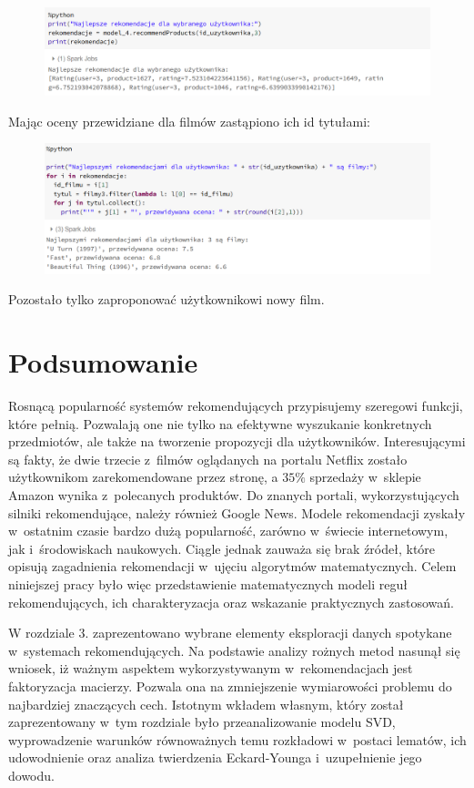 \documentclass[12pt,a4paper]{report}
\begin{document}
\begin{figure}[H]
\includegraphics[scale=0.5]{obrazy/ALS17.PNG} 
\end{figure}

Mając oceny przewidziane dla filmów zastąpiono ich id tytułami:

\begin{figure}[H]
\includegraphics[scale=0.5]{obrazy/ALS18.PNG} 
\end{figure}

Pozostało tylko zaproponować użytkownikowi nowy film.


\chapter{Podsumowanie}

Rosnącą popularność systemów rekomendujących przypisujemy szeregowi funkcji, które pełnią. Pozwalają one nie tylko na efektywne wyszukanie konkretnych przedmiotów, ale także na tworzenie propozycji dla użytkowników. Interesującymi są fakty, że dwie trzecie z~filmów oglądanych na portalu Netflix zostało użytkownikom zarekomendowane przez stronę, a $35 \% $ sprzedaży w~sklepie Amazon wynika z~polecanych produktów. Do znanych portali, wykorzystujących silniki rekomendujące, należy również Google News. Modele rekomendacji zyskały w~ostatnim czasie bardzo dużą popularność, zarówno w~świecie internetowym, jak i~środowiskach naukowych. Ciągle jednak zauważa się brak źródeł, które opisują zagadnienia rekomendacji w~ujęciu algorytmów matematycznych. Celem niniejszej pracy było więc przedstawienie matematycznych modeli reguł rekomendujących, ich charakteryzacja oraz wskazanie praktycznych zastosowań.

W rozdziale 3. zaprezentowano wybrane elementy eksploracji danych spotykane w~systemach rekomendujących. Na podstawie analizy rożnych metod nasunął się wniosek, iż ważnym aspektem wykorzystywanym w~rekomendacjach jest faktoryzacja macierzy. Pozwala ona na zmniejszenie wymiarowości problemu do najbardziej znaczących cech. Istotnym wkładem własnym, który został zaprezentowany w~tym rozdziale było przeanalizowanie modelu SVD, wyprowadzenie warunków równoważnych temu rozkładowi w~postaci lematów, ich udowodnienie oraz analiza twierdzenia Eckard-Younga i~uzupełnienie jego dowodu.
\end{document}
